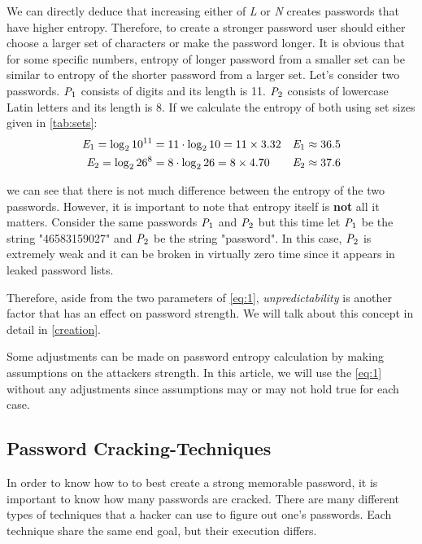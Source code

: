 \documentclass[acmsmall,nonacm]{acmart}
\begin{document}
We can directly deduce that increasing either of \emph{L} or \emph{N} creates passwords that have higher entropy. Therefore, to create a stronger password user should either choose a larger set of characters or make the password longer. It is obvious that for some specific numbers, entropy of longer password from a smaller set can be similar to entropy of the shorter password from a larger set. Let's consider two passwords. $\emph{P}_1$ consists of digits and its length is 11. $\emph{P}_2$ consists of lowercase Latin letters and its length is 8. If we calculate the entropy of both using set sizes given in \autoref{tab:sets}:
\begin{align*}\label{eq:p1p2calc}
    \emph{E}_1 = \log_2 10^{11} &= 11 \cdot \log_2 10 = 11 \times 3.32 &\emph{E}_1 \approx 36.5 \\
    \emph{E}_2 = \log_2 26^8  &= 8  \cdot \log_2 26   = 8 \times 4.70 &\emph{E}_2 \approx 37.6
\end{align*}

\noindent we can see that there is not much difference between the entropy of the two passwords. However, it is important to note that entropy itself is \textbf{not} all it matters. Consider the same passwords $\emph{P}_1$ and $\emph{P}_2$ but this time let $\emph{P}_1$ be the string "46583159027" and $\emph{P}_2$ be the string "password". In this case, $\emph{P}_2$ is extremely weak and it can be broken in virtually zero time since it appears in leaked password lists.

Therefore, aside from the two parameters of \autoref{eq:1}, \emph{unpredictability}  is another factor that has an effect on password strength. We will talk about this concept in detail in \autoref{creation}.

Some adjustments can be made on password entropy calculation by making assumptions on the attackers strength. In this article, we will use the \autoref{eq:1} without any adjustments since assumptions may or may not hold true for each case. 

\subsection{Password Cracking-Techniques}

In order to know how to to best create a strong memorable password, it is important to know how many passwords are cracked. There are many different types of techniques that a hacker can use to figure out one's passwords. Each technique share the same end goal, but their execution differs.
\end{document}
